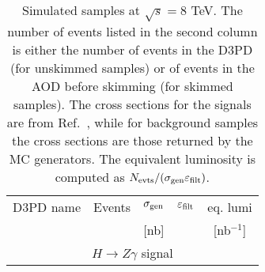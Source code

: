 \begin{sidewaystable}[!htbp]
  \begin{center}
    \caption{Simulated samples at $\sqrt{s}=8$ TeV. The number of events listed in the
      second column is either the number of events in the D3PD (for unskimmed samples)
      or of events in the AOD before skimming (for skimmed samples).
      The cross sections for the signals are from Ref.~\cite{LHCHiggsCrossSectionWorkingGroup:2012vm},
    while for background samples the cross sections are those returned by the MC generators.
      The equivalent luminosity is computed as $N_{\rm evts}/(\sigma_{\rm gen}\varepsilon_{\rm filt})$.}
    \label{tab:MCsamples_8TeV}
    \tiny
       \begin{tabular}{ccccc}
         \hline
         \hline
         D3PD name &           Events  &    $\sigma_{\rm gen}$ & $\varepsilon_{\rm filt}$ & eq. lumi \\
                   &                   &    [nb]              &                        &  [nb$^{-1}$]   \\
         \hline
         \multicolumn{5}{c}{$H\to Z\gamma$ signal} \\
         \hline


\end{tabular}
\end{center}
\end{sidewaystable}
